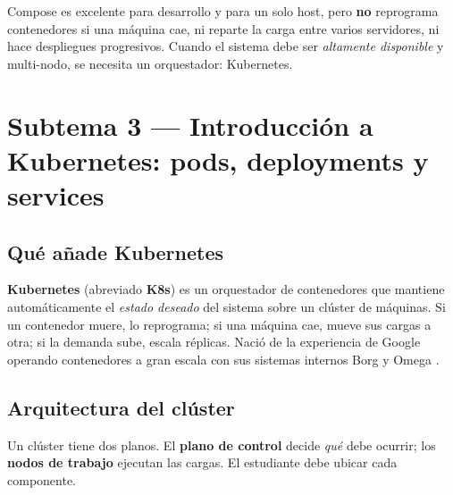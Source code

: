 \documentclass[11pt,a4paper]{article}
\begin{document}
\begin{warnbox}
Compose es excelente para desarrollo y para un solo host, pero \textbf{no} reprograma contenedores si una m\'aquina cae, ni reparte la carga entre varios servidores, ni hace despliegues progresivos. Cuando el sistema debe ser \emph{altamente disponible} y multi-nodo, se necesita un orquestador: Kubernetes.
\end{warnbox}

\section{Subtema 3 --- Introducci\'on a Kubernetes: pods, deployments y services}

\subsection{Qu\'e a\~nade Kubernetes}

\textbf{Kubernetes} (abreviado \textbf{K8s}) es un orquestador de contenedores que mantiene autom\'aticamente el \emph{estado deseado} del sistema sobre un cl\'uster de m\'aquinas. Si un contenedor muere, lo reprograma; si una m\'aquina cae, mueve sus cargas a otra; si la demanda sube, escala r\'eplicas. Naci\'o de la experiencia de Google operando contenedores a gran escala con sus sistemas internos Borg y Omega \cite{burns2016borg,bernstein2014}.

\subsection{Arquitectura del cl\'uster}

Un cl\'uster tiene dos planos. El \textbf{plano de control} decide \emph{qu\'e} debe ocurrir; los \textbf{nodos de trabajo} ejecutan las cargas. El estudiante debe ubicar cada componente.
\end{document}

